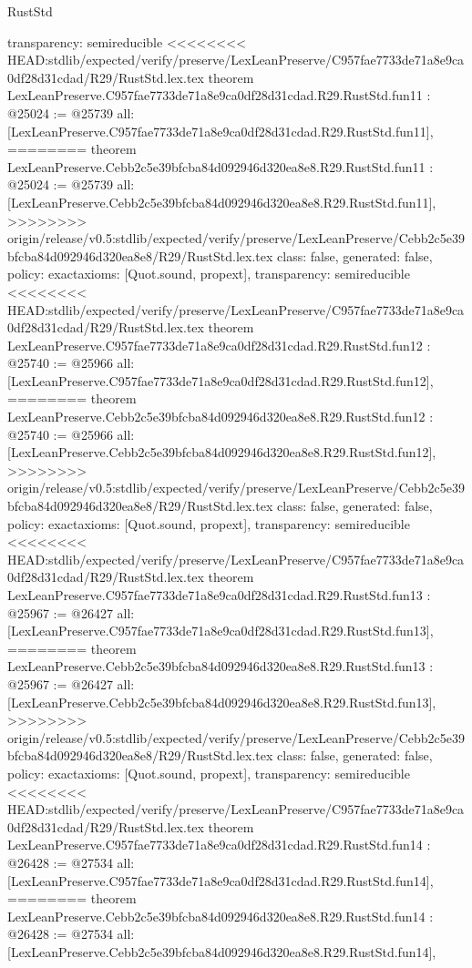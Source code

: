 \begin{lexlean}{RustStd}
\begin{coremodule}
{\begin{coremodule}
{{{{{{{{{{{{{{  transparency: semireducible
}
<<<<<<<< HEAD:stdlib/expected/verify/preserve/LexLeanPreserve/C957fae7733de71a8e9ca0df28d31cdad/R29/RustStd.lex.tex
theorem LexLeanPreserve.C957fae7733de71a8e9ca0df28d31cdad.R29.RustStd.fun11 : @25024 := @25739 {
  all: [LexLeanPreserve.C957fae7733de71a8e9ca0df28d31cdad.R29.RustStd.fun11],
========
theorem LexLeanPreserve.Cebb2c5e39bfcba84d092946d320ea8e8.R29.RustStd.fun11 : @25024 := @25739 {
  all: [LexLeanPreserve.Cebb2c5e39bfcba84d092946d320ea8e8.R29.RustStd.fun11],
>>>>>>>> origin/release/v0.5:stdlib/expected/verify/preserve/LexLeanPreserve/Cebb2c5e39bfcba84d092946d320ea8e8/R29/RustStd.lex.tex
  class: false,
  generated: false,
  policy: exact{axioms: [Quot.sound, propext]},
  transparency: semireducible
}
<<<<<<<< HEAD:stdlib/expected/verify/preserve/LexLeanPreserve/C957fae7733de71a8e9ca0df28d31cdad/R29/RustStd.lex.tex
theorem LexLeanPreserve.C957fae7733de71a8e9ca0df28d31cdad.R29.RustStd.fun12 : @25740 := @25966 {
  all: [LexLeanPreserve.C957fae7733de71a8e9ca0df28d31cdad.R29.RustStd.fun12],
========
theorem LexLeanPreserve.Cebb2c5e39bfcba84d092946d320ea8e8.R29.RustStd.fun12 : @25740 := @25966 {
  all: [LexLeanPreserve.Cebb2c5e39bfcba84d092946d320ea8e8.R29.RustStd.fun12],
>>>>>>>> origin/release/v0.5:stdlib/expected/verify/preserve/LexLeanPreserve/Cebb2c5e39bfcba84d092946d320ea8e8/R29/RustStd.lex.tex
  class: false,
  generated: false,
  policy: exact{axioms: [Quot.sound, propext]},
  transparency: semireducible
}
<<<<<<<< HEAD:stdlib/expected/verify/preserve/LexLeanPreserve/C957fae7733de71a8e9ca0df28d31cdad/R29/RustStd.lex.tex
theorem LexLeanPreserve.C957fae7733de71a8e9ca0df28d31cdad.R29.RustStd.fun13 : @25967 := @26427 {
  all: [LexLeanPreserve.C957fae7733de71a8e9ca0df28d31cdad.R29.RustStd.fun13],
========
theorem LexLeanPreserve.Cebb2c5e39bfcba84d092946d320ea8e8.R29.RustStd.fun13 : @25967 := @26427 {
  all: [LexLeanPreserve.Cebb2c5e39bfcba84d092946d320ea8e8.R29.RustStd.fun13],
>>>>>>>> origin/release/v0.5:stdlib/expected/verify/preserve/LexLeanPreserve/Cebb2c5e39bfcba84d092946d320ea8e8/R29/RustStd.lex.tex
  class: false,
  generated: false,
  policy: exact{axioms: [Quot.sound, propext]},
  transparency: semireducible
}
<<<<<<<< HEAD:stdlib/expected/verify/preserve/LexLeanPreserve/C957fae7733de71a8e9ca0df28d31cdad/R29/RustStd.lex.tex
theorem LexLeanPreserve.C957fae7733de71a8e9ca0df28d31cdad.R29.RustStd.fun14 : @26428 := @27534 {
  all: [LexLeanPreserve.C957fae7733de71a8e9ca0df28d31cdad.R29.RustStd.fun14],
========
theorem LexLeanPreserve.Cebb2c5e39bfcba84d092946d320ea8e8.R29.RustStd.fun14 : @26428 := @27534 {
  all: [LexLeanPreserve.Cebb2c5e39bfcba84d092946d320ea8e8.R29.RustStd.fun14],
}}}}}}}}}}}}}}}}}}
\end{coremodule}}
\end{coremodule}
\end{lexlean}
